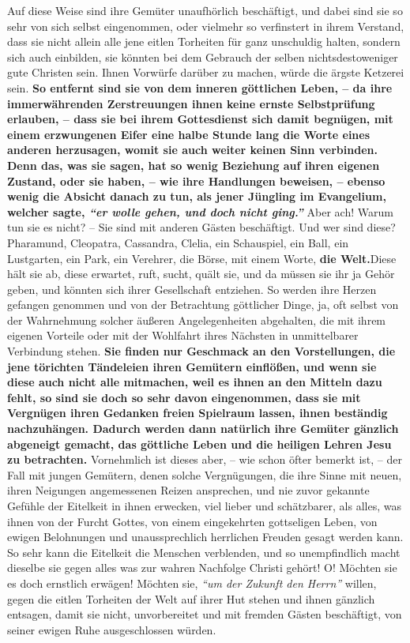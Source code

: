 Auf diese Weise sind ihre Gemüter unaufhörlich beschäftigt, und dabei sind sie
so sehr von sich selbst eingenommen, oder vielmehr so verfinstert in ihrem
Verstand, dass sie nicht allein alle jene eitlen Torheiten für ganz unschuldig
halten, sondern sich auch einbilden, sie könnten bei dem Gebrauch der selben
nichtsdestoweniger gute Christen sein. Ihnen Vorwürfe
darüber zu machen, würde
die ärgste Ketzerei sein.
\label{ref:17_04_gottesdienst}
\textbf{So entfernt sind sie von dem inneren göttlichen Leben,
-- da ihre immerwährenden Zerstreuungen ihnen keine ernste
Selbstprüfung
erlauben, -- dass sie bei ihrem Gottesdienst
sich damit begnügen, mit einem
erzwungenen Eifer eine halbe Stunde lang die Worte eines anderen herzusagen,
womit sie auch weiter keinen Sinn verbinden. Denn das, was sie sagen, hat so
wenig Beziehung auf ihren eigenen Zustand, oder sie haben, -- wie ihre
Handlungen beweisen, -- ebenso wenig die Absicht danach zu tun, als jener
Jüngling im Evangelium, welcher sagte,
\textit{"`er wolle gehen, und doch nicht ging."'}}
Aber ach! Warum tun sie es nicht? -- Sie sind mit anderen Gästen beschäftigt.
Und wer sind diese? Pharamund,
Cleopatra, Cassandra,
Clelia, ein Schauspiel, ein
Ball, ein Lustgarten, ein Park, ein Verehrer, die Börse, mit einem
Worte, \textbf{die
Welt.}Diese hält sie ab, diese erwartet, ruft,
sucht, quält sie, und da müssen
sie ihr ja Gehör geben, und könnten sich ihrer Gesellschaft entziehen. So werden
ihre Herzen gefangen genommen und von der Betrachtung göttlicher Dinge, ja, oft
selbst von der Wahrnehmung solcher äußeren Angelegenheiten abgehalten, die mit
ihrem eigenen Vorteile oder mit der Wohlfahrt ihres Nächsten in unmittelbarer
Verbindung stehen. \textbf{Sie finden nur Geschmack an den Vorstellungen, die
jene
törichten Tändeleien ihren Gemütern einflößen, und wenn sie diese auch nicht
alle mitmachen, weil es ihnen an den Mitteln dazu fehlt, so sind sie doch so
sehr davon eingenommen, dass sie mit Vergnügen ihren Gedanken freien Spielraum
lassen, ihnen beständig nachzuhängen. Dadurch werden dann natürlich ihre
Gemüter gänzlich abgeneigt gemacht, das göttliche Leben und die heiligen Lehren
Jesu zu betrachten.} Vornehmlich ist dieses aber, -- wie schon öfter bemerkt
ist,
-- der Fall mit jungen Gemütern, denen solche Vergnügungen, die ihre Sinne mit
neuen, ihren Neigungen angemessenen Reizen ansprechen, und nie zuvor gekannte
Gefühle der Eitelkeit in ihnen erwecken, viel lieber und schätzbarer, als
alles, was ihnen von der Furcht Gottes, von einem eingekehrten gottseligen
Leben, von ewigen Belohnungen und unaussprechlich herrlichen Freuden gesagt
werden kann. So sehr kann die Eitelkeit die Menschen verblenden, und so
unempfindlich macht dieselbe sie gegen alles was zur wahren Nachfolge Christi
gehört! O! Möchten sie es doch ernstlich erwägen! Möchten sie,
\textit{"`um der Zukunft
den Herrn"'} willen, gegen die eitlen Torheiten der Welt auf ihrer Hut stehen
und ihnen gänzlich entsagen, damit sie nicht, unvorbereitet und mit fremden
Gästen beschäftigt, von seiner ewigen Ruhe ausgeschlossen würden.

